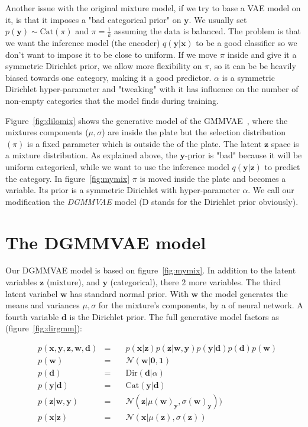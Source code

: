\documentclass[11pt, a4paper]{report}
\theoremstyle{plain}
\theoremstyle{definition}
\theoremstyle{remark}
\newcommand{\x}{\mathbf{x}}
\newcommand{\z}{\mathbf{z}}
\newcommand{\y}{\mathbf{y}}
\newcommand{\w}{\mathbf{w}}
\newcommand{\dd}{\mathbf{d}}
\newcommand{\NN}{\mathcal{N}}
\newcommand{\bv}[1]{\boldsymbol{#1}}
\begin{document}
Another issue with the original mixture model, if we try to base a VAE model on
it, is that it imposes a "bad categorical prior" on $\y$. We usually set $p(\y) \sim
\text{Cat}(\pi)$ and $\pi=\frac{1}{k}$ assuming the data is balanced. The
problem is that we want the inference model (the encoder) $q(\y | \x)$ to be a
good classifier so we don't want to impose it to be close to uniform. 
If we move
$\pi$ inside and give it a symmetric Dirichlet prior, we allow more
flexibility on $\pi$, so it can be be heavily biased towards one category, making it a good
predictor. $\alpha$ is a symmetric Dirichlet hyper-parameter and "tweaking" with
it has influence on the number of non-empty categories that the model finds
during training.

Figure~\ref{fig:dilomix} shows the generative model of the 
GMMVAE~\cite{dilokthanakul2016deep}, where the mixtures components ($\mu, \sigma$)
are inside the plate but the selection distribution $(\pi)$ is a fixed parameter
which is outside the of the plate.
The latent $\z$ space is a mixture distribution. As explained above, the $\y$-prior is
"bad" because it will be uniform categorical, while we want to use the inference
model $q(\y | \z)$ to predict the category.
In figure~\ref{fig:mymix} $\pi$ is moved inside the plate and becomes a variable. Its prior is a
symmetric Dirichlet with hyper-parameter $\alpha$.
We call our modification the \emph{DGMMVAE} model (D stands for the Dirichlet prior
obviously).

\section{The DGMMVAE model}

Our DGMMVAE model is based on figure~\ref{fig:mymix}.
In addition to the latent variables $\z$ (mixture), and $\y$ (categorical), there
$2$ more variables.
The third latent variabel $\w$ has standard normal prior.
With $\w$ the model generates the means and variances $\mu,
\sigma$ for the mixture's components, by a of neural network.
A fourth variable $\dd$ is the Dirichlet prior.
The full generative model factors as (figure~\ref{fig:dirgmm}):

\begin{equation}
\begin{aligned}
&p(\x, \y, \z, \w, \dd) &=\quad& 
p(\x | \z) p(\z | \w, \y) p(\y | \dd) p(\dd) p(\w) \\
&p(\w) &=\quad& \NN(\w | \bv{0},\bv{1}) \\
&p(\dd) &=\quad& \text{Dir}(\dd | \alpha) \\
&p(\y | \dd) &=\quad& \text{Cat}(\y | \dd) \\
&p(\z | \w, \y) &=\quad& \NN(\z | \mu(\w)_{\y}, \sigma(\w)_{\y})) \\
&p(\x | \z) &=\quad& \NN(\x | \mu(\z), \sigma(\z))
\label{eq:gmmfact}
\end{aligned}
\end{equation}
\end{document}
